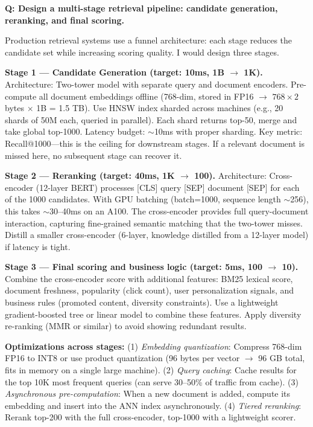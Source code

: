 \begin{interviewq}
\textbf{Q: Design a multi-stage retrieval pipeline: candidate generation, reranking, and final scoring.}

 \quad {} \quad \badgefreq{\freqhigh}

\stronganswer

Production retrieval systems use a funnel architecture: each stage reduces the candidate set while increasing scoring quality. I would design three stages.

\textbf{Stage 1 --- Candidate Generation (target: 10ms, 1B $\to$ 1K).} Architecture: Two-tower model with separate query and document encoders. Pre-compute all document embeddings offline (768-dim, stored in FP16 $\to$ $768 \times 2$ bytes $\times$ 1B = 1.5 TB). Use HNSW index sharded across machines (e.g., 20 shards of 50M each, queried in parallel). Each shard returns top-50, merge and take global top-1000. Latency budget: $\sim$10ms with proper sharding. Key metric: Recall@1000---this is the ceiling for downstream stages. If a relevant document is missed here, no subsequent stage can recover it.

\textbf{Stage 2 --- Reranking (target: 40ms, 1K $\to$ 100).} Architecture: Cross-encoder (12-layer BERT) processes [CLS] query [SEP] document [SEP] for each of the 1000 candidates. With GPU batching (batch=1000, sequence length $\sim$256), this takes $\sim$30--40ms on an A100. The cross-encoder provides full query-document interaction, capturing fine-grained semantic matching that the two-tower misses. Distill a smaller cross-encoder (6-layer, knowledge distilled from a 12-layer model) if latency is tight.

\textbf{Stage 3 --- Final scoring and business logic (target: 5ms, 100 $\to$ 10).} Combine the cross-encoder score with additional features: BM25 lexical score, document freshness, popularity (click count), user personalization signals, and business rules (promoted content, diversity constraints). Use a lightweight gradient-boosted tree or linear model to combine these features. Apply diversity re-ranking (MMR or similar) to avoid showing redundant results.

\textbf{Optimizations across stages:} (1) \textit{Embedding quantization}: Compress 768-dim FP16 to INT8 or use product quantization (96 bytes per vector $\to$ 96 GB total, fits in memory on a single large machine). (2) \textit{Query caching}: Cache results for the top 10K most frequent queries (can serve 30--50\% of traffic from cache). (3) \textit{Asynchronous pre-computation}: When a new document is added, compute its embedding and insert into the ANN index asynchronously. (4) \textit{Tiered reranking}: Rerank top-200 with the full cross-encoder, top-1000 with a lightweight scorer.


\end{interviewq}
